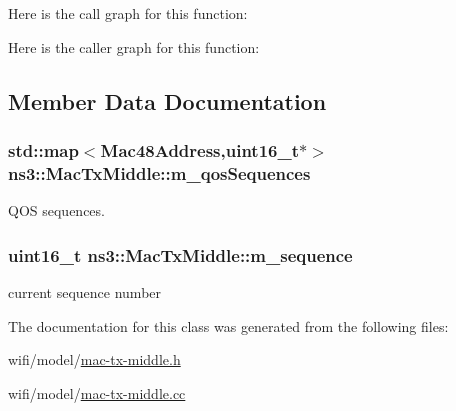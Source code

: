 Here is the call graph for this function\+:




Here is the caller graph for this function\+:




\subsection{Member Data Documentation}
\subsubsection[{\texorpdfstring{m\+\_\+qos\+Sequences}{m_qosSequences}}]{\setlength{\rightskip}{0pt plus 5cm}std\+::map$<${\bf Mac48\+Address},uint16\+\_\+t$\ast$$>$ ns3\+::\+Mac\+Tx\+Middle\+::m\+\_\+qos\+Sequences\hspace{0.3cm}{\ttfamily [private]}}\hypertarget{classns3_1_1MacTxMiddle_ac772ae494e77aa273bece9a75f002202}{}\label{classns3_1_1MacTxMiddle_ac772ae494e77aa273bece9a75f002202}


Q\+OS sequences. 

\subsubsection[{\texorpdfstring{m\+\_\+sequence}{m_sequence}}]{\setlength{\rightskip}{0pt plus 5cm}uint16\+\_\+t ns3\+::\+Mac\+Tx\+Middle\+::m\+\_\+sequence\hspace{0.3cm}{\ttfamily [private]}}\hypertarget{classns3_1_1MacTxMiddle_a5b304f299ca20dc220dece4cab00d322}{}\label{classns3_1_1MacTxMiddle_a5b304f299ca20dc220dece4cab00d322}


current sequence number 



The documentation for this class was generated from the following files\+:\begin{DoxyCompactItemize}
\item 
wifi/model/\hyperlink{mac-tx-middle_8h}{mac-\/tx-\/middle.\+h}\item 
wifi/model/\hyperlink{mac-tx-middle_8cc}{mac-\/tx-\/middle.\+cc}\end{DoxyCompactItemize}
